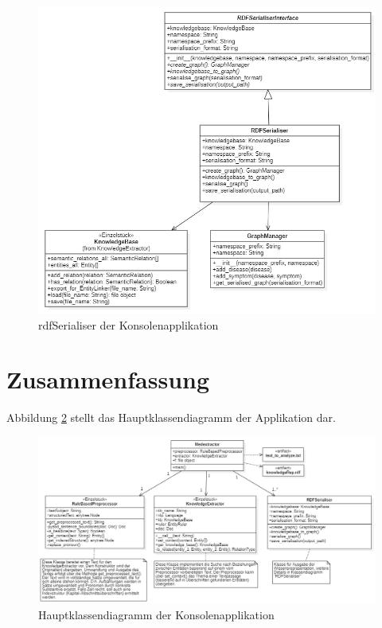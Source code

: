 \begin{figure}[h]
    \centering
    \includegraphics[width=\textwidth]{pictures/RDFSerialiser.png}
    \caption{rdfSerialiser der Konsolenapplikation}
    \label{fig:rdfSerialiser}
\end{figure}



\section{Zusammenfassung}
\label{sec:zusammenfassung modellierung} 

Abbildung \ref{fig:mainClassDiagram} stellt das Hauptklassendiagramm der Applikation dar.

\begin{figure}[h]
    \centering
    \includegraphics[width=\textwidth]{pictures/Main.png}
    \caption{Hauptklassendiagramm der Konsolenapplikation}
    \label{fig:mainClassDiagram}
\end{figure}